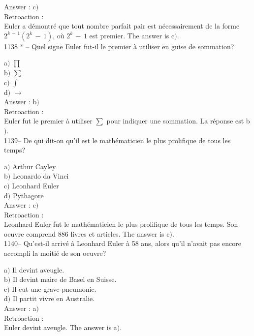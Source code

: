 ﻿\documentclass[letterpaper, 12pt]{article}
\begin{document}
Answer : c$)$\\

Retroaction : \\
Euler a d\'emontr\'e que tout nombre parfait pair est
n\'ecessairement de la forme $2^{k\,-\,1}(2^k\,-\,1)$, o\`u
$2^k\,-\,1$ est premier.
The answer is c$)$.\\

1138 * -- Quel signe Euler fut-il le premier \`a utiliser en guise
de sommation?

a$)$ $\prod$ \\[1mm]
b$)$ $\sum$  \\[1mm]
c$)$ $\int$   \\[1mm]
d$)$ $\to$  \\

Answer : b$)$\\

Retroaction : \\
Euler fut le premier \`a utiliser $\sum$ pour indiquer une sommation. La
r\'eponse est b$)$. \\

1139-- De qui dit-on qu'il est le math\'ematicien le plus prolifique
de tous les temps?

a$)$ Arthur Cayley \\
b$)$ Leonardo da Vinci  \\
c$)$ Leonhard Euler   \\
d$)$ Pythagore  \\

Answer : c$)$\\

Retroaction : \\
Leonhard Euler fut le math\'ematicien le plus prolifique de tous les temps.
Son oeuvre comprend 886 livres et articles. The answer is c$)$. \\

1140-- Qu'est-il arriv\'e \`a Leonhard Euler \`a 58 ans, alors qu'il
n'avait pas encore accompli la moiti\'e de son oeuvre?

a$)$ Il devint aveugle. \\
b$)$ Il devint maire de Basel en Suisse.   \\
c$)$ Il eut une grave pneumonie.   \\
d$)$ Il partit vivre en Australie.  \\

Answer : a$)$\\

Retroaction : \\
Euler devint aveugle. The answer is a$)$. \\
\end{document}

